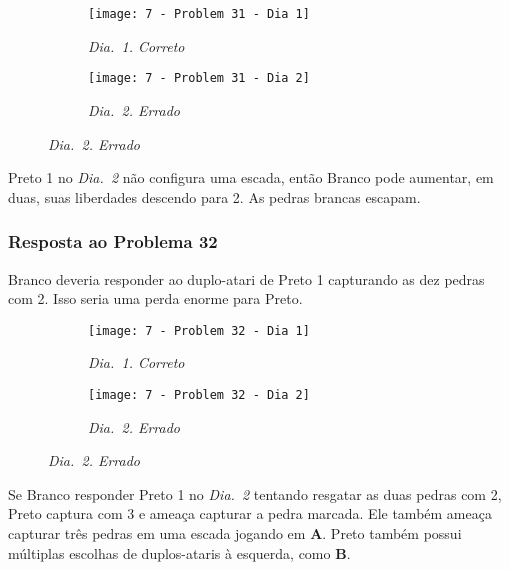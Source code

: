 \begin{figure}[h!]
    \centering
    \begin{subfigure}[t]{.425\textwidth}
        \texttt{[image: 7 - Problem 31 - Dia 1]}
        \captionsetup{justification=centering}
        \caption*{\emph{Dia.\@~1. Correto}}
    \end{subfigure}
    \hspace{1cm}
    \begin{subfigure}[t]{.425\textwidth}
        \texttt{[image: 7 - Problem 31 - Dia 2]}
        \captionsetup{justification=centering}
        \caption*{\emph{Dia.\@~2. Errado}}
    \end{subfigure}
\end{figure}

Preto 1 no \emph{Dia.\@~2} não configura uma escada, então Branco pode aumentar, em duas, suas liberdades descendo para 2. As pedras brancas escapam.

\pagebreak

\subsubsection*{Resposta ao Problema 32}

Branco deveria responder ao duplo-atari de Preto 1 capturando as dez pedras com 2. Isso seria uma perda enorme para Preto.

\begin{figure}[h!]
    \centering
    \begin{subfigure}[t]{.425\textwidth}
        \texttt{[image: 7 - Problem 32 - Dia 1]}
        \captionsetup{justification=centering}
        \caption*{\emph{Dia.\@~1. Correto}}
    \end{subfigure}
    \hspace{1cm}
    \begin{subfigure}[t]{.425\textwidth}
        \texttt{[image: 7 - Problem 32 - Dia 2]}
        \captionsetup{justification=centering}
        \caption*{\emph{Dia.\@~2. Errado}}
    \end{subfigure}
\end{figure}

Se Branco responder Preto 1 no \emph{Dia.\@~2} tentando resgatar as duas pedras com 2, Preto captura com 3 e ameaça capturar a pedra marcada. Ele também ameaça capturar três pedras em uma escada jogando em \textbf{A}. Preto também possui múltiplas escolhas de duplos-ataris à esquerda, como \textbf{B}.

